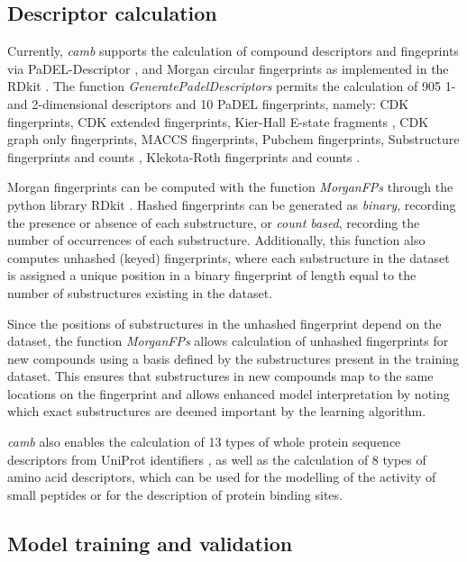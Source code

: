 \documentclass{bioinfo}
\begin{document}
\subsection{Descriptor calculation} 

Currently, {\it camb} supports the calculation of compound descriptors and fingeprints via PaDEL-Descriptor \citep{padel},
and Morgan circular fingerprints \citep{extended_fp} as implemented in the RDkit \citep{rdkit}.
The function {\it GeneratePadelDescriptors} permits the calculation of 905 1- and 2-dimensional descriptors and 10 PaDEL fingerprints, namely: 
CDK fingerprints, CDK extended fingerprints, Kier-Hall E-state fragments \cite{state_fp}, CDK graph only fingerprints, MACCS fingerprints,
Pubchem fingerprints, Substructure fingerprints and counts \citep{obabel}, Klekota-Roth fingerprints and counts \citep{privileged_substructures}.

Morgan fingerprints can be computed with the function {\it MorganFPs}
through the python library RDkit \citep{rdkit}.
Hashed fingerprints can be generated as \textit{binary}, recording the presence or absence of each substructure,
 or \textit{count based}, recording the number of occurrences of each substructure.
Additionally, this function also computes unhashed (keyed) fingerprints, 
where each substructure in the dataset is assigned a unique position in a binary fingerprint of length equal to the number of substructures existing in the dataset.

Since the positions of substructures in the unhashed fingerprint depend on the dataset, the function {\it MorganFPs} allows calculation of unhashed fingerprints for new compounds using a basis defined by the substructures present in the training dataset. This ensures that substructures in new compounds map to the same locations on the fingerprint and allows enhanced model interpretation by noting which exact substructures are deemed important by the learning algorithm.

{\it camb} also enables the calculation of 13 types of whole protein sequence descriptors
from UniProt identifiers \citep{protr},
as well as the calculation of 8 types of amino acid descriptors,
which can be used for the modelling of the activity of small peptides
or for the description of protein binding sites\citep{AA_benchmark}.

\subsection{Model training and validation}
\end{document}

